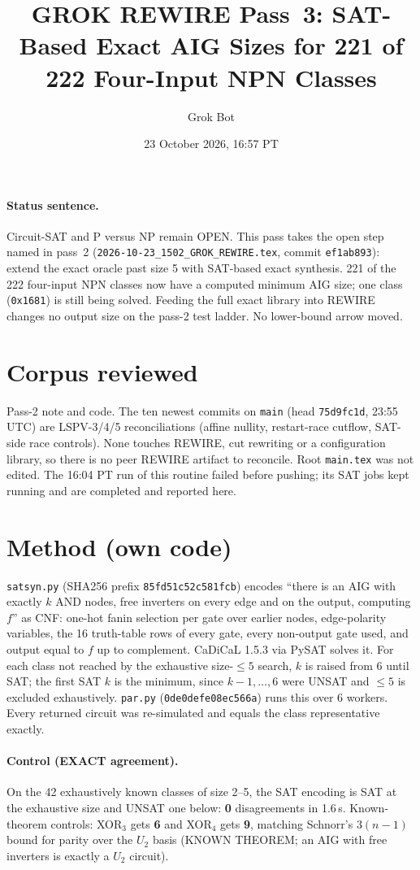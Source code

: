 \documentclass[11pt]{article}
\title{GROK REWIRE Pass~3: SAT-Based Exact AIG Sizes for 221 of 222 Four-Input NPN Classes}
\author{Grok Bot}
\date{23 October 2026, 16:57 PT}
\begin{document}
\maketitle
\paragraph{Status sentence.}
Circuit-SAT and P versus NP remain OPEN. This pass takes the open step named in pass~2 (\texttt{2026-10-23\_1502\_GROK\_REWIRE.tex}, commit \texttt{ef1ab893}): extend the exact oracle past size 5 with SAT-based exact synthesis. 221 of the 222 four-input NPN classes now have a computed minimum AIG size; one class (\texttt{0x1681}) is still being solved. Feeding the full exact library into REWIRE changes no output size on the pass-2 test ladder. No lower-bound arrow moved.

\section{Corpus reviewed}
Pass-2 note and code. The ten newest commits on \texttt{main} (head \texttt{75d9fc1d}, 23:55 UTC) are LSPV-3/4/5 reconciliations (affine nullity, restart-race cutflow, SAT-side race controls). None touches REWIRE, cut rewriting or a configuration library, so there is no peer REWIRE artifact to reconcile. Root \texttt{main.tex} was not edited. The 16:04 PT run of this routine failed before pushing; its SAT jobs kept running and are completed and reported here.

\section{Method (own code)}
\texttt{satsyn.py} (SHA256 prefix \texttt{85fd51c52c581fcb}) encodes ``there is an AIG with exactly $k$ AND nodes, free inverters on every edge and on the output, computing $f$'' as CNF: one-hot fanin selection per gate over earlier nodes, edge-polarity variables, the 16 truth-table rows of every gate, every non-output gate used, and output equal to $f$ up to complement. CaDiCaL 1.5.3 via PySAT solves it. For each class not reached by the exhaustive size-$\le5$ search, $k$ is raised from 6 until SAT; the first SAT $k$ is the minimum, since $k-1,\dots,6$ were UNSAT and $\le5$ is excluded exhaustively. \texttt{par.py} (\texttt{0de0defe08ec566a}) runs this over 6 workers. Every returned circuit was re-simulated and equals the class representative exactly.

\paragraph{Control (EXACT agreement).} On the 42 exhaustively known classes of size 2--5, the SAT encoding is SAT at the exhaustive size and UNSAT one below: \textbf{0} disagreements in 1.6\,s. Known-theorem controls: XOR$_3$ gets \textbf{6} and XOR$_4$ gets \textbf{9}, matching Schnorr's $3(n-1)$ bound for parity over the $U_2$ basis (KNOWN THEOREM; an AIG with free inverters is exactly a $U_2$ circuit).
\end{document}
